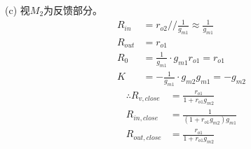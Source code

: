 \documentclass[hyperref, UTF8]{ctexart}
\newcommand{\under}[1]{\frac{1}{#1}}
\begin{document}
    (c) 视$M_2$为反馈部分。
    \begin{align*}
        R_{in} & = r_{o2} // \under{g_{m1}} \approx \under{g_{m1}} \\
        R_{out} & = r_{o1} \\
        R_0 & = \under{g_{m1}} \cdot g_{m1} r_{o1} = r_{o1} \\
        K & = -\under{g_{m1}} \cdot g_{m2}g_{m1} = -g_{m2}
    \end{align*}
    \begin{align*}
        \therefore R_{v, close} & = \frac{r_{o1}}{1+r_{o1}g_{m2}}\\
        R_{in,close} & = \under{(1+r_{o1}g_{m2})g_{m1}}\\
        R_{out,close} & = \frac{r_{o1}}{1+r_{o1}g_{m2}}
    \end{align*}
\end{document}
